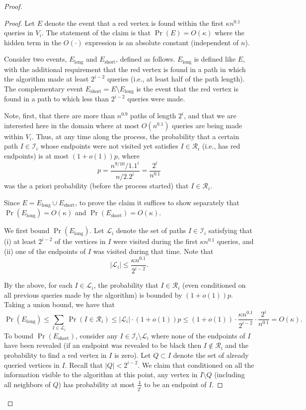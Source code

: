 \documentclass[11pt]{article}
\numberwithin{equation}{section}
\newcommand{\1}{\mathbf{1}}
\begin{document}
\begin{proof}
\newcommand{\ELONG}{{E_{\text{long}}}}
\newcommand{\ESHORT}{{E_{\text{short}}}}

\begin{proof}
Let $E$ denote the event that a red vertex is found within the first $\kappa n^{0.1}$ queries in $V_i$. The statement of the claim is that $\Pr(E) = O(\kappa)$ where the hidden term in the $O(\cdot)$ expression is an absolute constant (independent of $n$).

Consider two events, $\ELONG$ and $\ESHORT$, defined as follows. $\ELONG$ is defined like $E$, with the additional requirement that the red vertex is found in a path in which the algorithm made at least $2^{i-2}$ queries (i.e., at least half of the path length). The complementary event $\ESHORT = E \setminus \ELONG$ is the event that the red vertex is found in a path to which less than $2^{i-2}$ queries were made.

Note, first, that there are more than $n^{0.9}$ paths of length $2^i$, and that we are interested here in the domain where at most $O(n^{0.1})$ queries are being made within $V_i$. Thus, at any time along the process, the probability that a certain path $I \in \mathcal{I}_i$ whose endpoints were not visited yet satisfies $I \in \mathcal{R}_i$ (i.e., has red endpoints) is at most $(1+o(1)) p$, where 
$$p = \frac{n^{9/10} / 1.1^i}{n / 2.2^i} = \frac{2^i}{n^{0.1}}$$ 
was the a priori probability (before the process started) that $I \in \mathcal{R}_i$.

Since $E = \ELONG \cup \ESHORT$, to prove the claim it suffices to show separately that $\Pr(\ELONG) = O(\kappa)$ and $\Pr(\ESHORT) = O(\kappa)$. 

We first bound $\Pr(\ELONG)$. Let $\mathcal{L}_i$ denote the set of paths $I \in \mathcal{I}_i$ satisfying that (i) at least $2^{i-2}$ of the vertices in $I$ were visited during the first $\kappa n^{0.1}$ queries, and (ii) one of the endpoints of $I$ was visited during that time. Note that
$$|\mathcal{L}_i| \leq \frac{\kappa n^{0.1}}  {2^{i-2}}.$$ 

By the above, for each $I \in \mathcal{L}_i$, the probability that $I \in \mathcal{R}_i$ (even conditioned on all previous queries made by the algorithm) is bounded by $(1+o(1)) p$. Taking a union bound, we have that
$$
\Pr(\ELONG) \leq \sum_{I \in \mathcal{L}_i} \Pr(I \in \mathcal{R}_i) \leq |\mathcal{L}_i| \cdot (1+o(1)) p  \leq (1+o(1)) \cdot \frac{\kappa n^{0.1}}  {2^{i-2}} \cdot \frac{2^i}{n^{0.1}} = O(\kappa).
$$
To bound $\Pr(\ESHORT)$, consider any $I \in \mathcal{I}_i \setminus \mathcal{L}_i$ where none of the endpoints of $I$ have been revealed (if an endpoint was revealed to be black then $I \notin \mathcal{R}_i$ and the probability to find a red vertex in $I$ is zero). 
Let $Q \subset I$ denote the set of already queried vertices in $I$. Recall that $|Q| < 2^{i-2}$. We claim that conditioned on all the information visible to the algorithm at this point, any vertex in $I \setminus Q$ (including all neighbors of $Q$) has probability at most $\frac{4}{2^{i}}$ to be an endpoint of $I$. 


\end{proof}
\end{proof}
\end{document}

